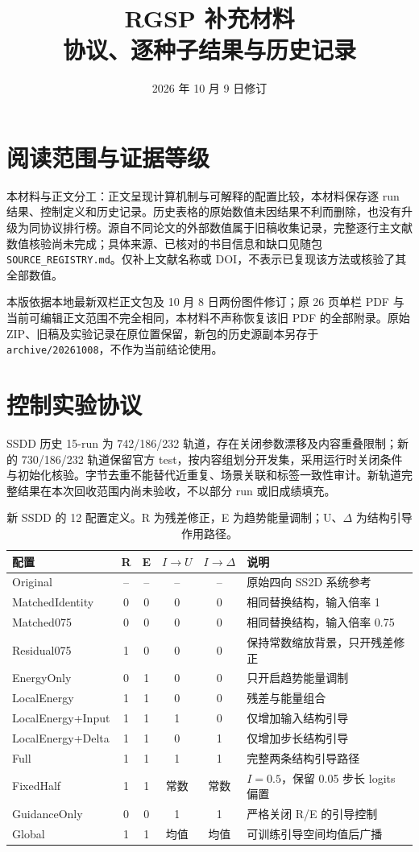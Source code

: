 \documentclass[UTF8,fontset=fandol,10pt]{ctexart}
\title{RGSP 补充材料\\协议、逐种子结果与历史记录}
\author{}
\date{2026 年 10 月 9 日修订}
\begin{document}
\maketitle
\section{阅读范围与证据等级}
本材料与正文分工：正文呈现计算机制与可解释的配置比较，本材料保存逐 run 结果、控制定义和历史记录。历史表格的原始数值未因结果不利而删除，也没有升级为同协议排行榜。源自不同论文的外部数值属于旧稿收集记录，完整逐行主文献数值核验尚未完成；具体来源、已核对的书目信息和缺口见随包 \texttt{SOURCE\_REGISTRY.md}。仅补上文献名称或 DOI，不表示已复现该方法或核验了其全部数值。

本版依据本地最新双栏正文包及 10 月 8 日两份图件修订；原 26 页单栏 PDF 与当前可编辑正文范围不完全相同，本材料不声称恢复该旧 PDF 的全部附录。原始 ZIP、旧稿及实验记录在原位置保留，新包的历史源副本另存于 \texttt{archive/20261008}，不作为当前结论使用。

\section{控制实验协议}
SSDD 历史 15-run 为 742/186/232 轨道，存在关闭参数漂移及内容重叠限制；新的 730/186/232 轨道保留官方 test，按内容组划分开发集，采用运行时关闭条件与初始化核验。字节去重不能替代近重复、场景关联和标签一致性审计。新轨道完整结果在本次回收范围内尚未验收，不以部分 run 或旧成绩填充。

\begin{table}[!htbp]
\centering\small
\caption{新 SSDD 的 12 配置定义。R 为残差修正，E 为趋势能量调制；U、$\Delta$ 为结构引导作用路径。}
\begin{tabularx}{\linewidth}{@{}lccccX@{}}
\toprule
配置 & R&E&$I\to U$&$I\to\Delta$&说明\\
\midrule
Original & --&--&--&--&原始四向 SS2D 系统参考\\
MatchedIdentity&0&0&0&0&相同替换结构，输入倍率 1\\
Matched075&0&0&0&0&相同替换结构，输入倍率 0.75\\
Residual075&1&0&0&0&保持常数缩放背景，只开残差修正\\
EnergyOnly&0&1&0&0&只开启趋势能量调制\\
LocalEnergy&1&1&0&0&残差与能量组合\\
LocalEnergy+Input&1&1&1&0&仅增加输入结构引导\\
LocalEnergy+Delta&1&1&0&1&仅增加步长结构引导\\
Full&1&1&1&1&完整两条结构引导路径\\
FixedHalf&1&1&常数&常数&$I=0.5$，保留 0.05 步长 logits 偏置\\
GuidanceOnly&0&0&1&1&严格关闭 R/E 的引导控制\\
Global&1&1&均值&均值&可训练引导空间均值后广播\\
\bottomrule
\end{tabularx}
\end{table}
\FloatBarrier
\end{document}
